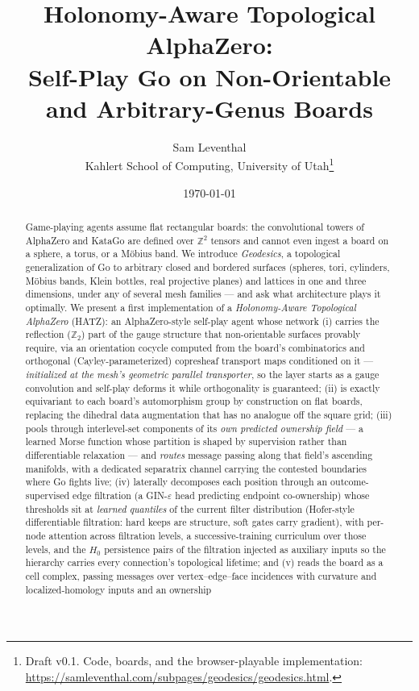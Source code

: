 \documentclass[11pt]{article}
\title{\textbf{Holonomy-Aware Topological AlphaZero:\\
Self-Play Go on Non-Orientable and Arbitrary-Genus Boards}}
\author{Sam Leventhal\\
\small Kahlert School of Computing, University of Utah\thanks{Draft
v0.1. Code, boards, and the browser-playable implementation:
\url{https://samleventhal.com/subpages/geodesics/geodesics.html}.}}
\date{\today}
\newcommand{\eps}{\varepsilon}
\newcommand{\ZZ}{\mathbb{Z}}
\begin{document}
\maketitle

\begin{abstract}
Game-playing agents assume flat rectangular boards: the convolutional
towers of AlphaZero and KataGo are defined over $\ZZ^2$ tensors and cannot
even ingest a board on a sphere, a torus, or a M\"obius band. We introduce
\emph{Geodesics}, a topological generalization of Go to arbitrary
closed and bordered surfaces (spheres, tori, cylinders, M\"obius bands,
Klein bottles, real projective planes) and lattices in one and three
dimensions, under any of several mesh families --- and ask what
architecture plays it optimally. We present a first implementation of a
\emph{Holonomy-Aware Topological AlphaZero} (HATZ): an AlphaZero-style
self-play agent whose network (i) carries the reflection ($\ZZ_2$) part of
the gauge structure that non-orientable surfaces provably require, via an
orientation cocycle computed from the board's combinatorics and
orthogonal (Cayley-parameterized) copresheaf transport maps conditioned
on it --- \emph{initialized at the mesh's geometric parallel
transporter}, so the layer starts as a gauge convolution and self-play
deforms it while orthogonality is guaranteed; (ii) is exactly equivariant
to each board's automorphism group by construction on flat boards,
replacing the dihedral
data augmentation that has no analogue off the square grid; (iii) pools through interlevel-set components of its \emph{own predicted
ownership field} --- a learned Morse function whose partition is shaped by
supervision rather than differentiable relaxation --- and \emph{routes}
message passing along that field's ascending manifolds, with a dedicated
separatrix channel carrying the contested boundaries where Go fights
live; (iv) laterally
decomposes each position through an outcome-supervised edge filtration
(a GIN-$\eps$ head predicting endpoint co-ownership) whose thresholds sit
at \emph{learned quantiles} of the current filter distribution
(Hofer-style differentiable filtration: hard keeps are structure, soft
gates carry gradient), with per-node
attention across filtration levels, a successive-training curriculum over
those levels, and the $H_0$ persistence pairs of the filtration injected
as auxiliary inputs so the hierarchy carries every connection's
topological lifetime; and (v) reads
the board as a cell complex, passing messages over vertex--edge--face
incidences with curvature and localized-homology inputs and an ownership

\end{abstract}
\end{document}
